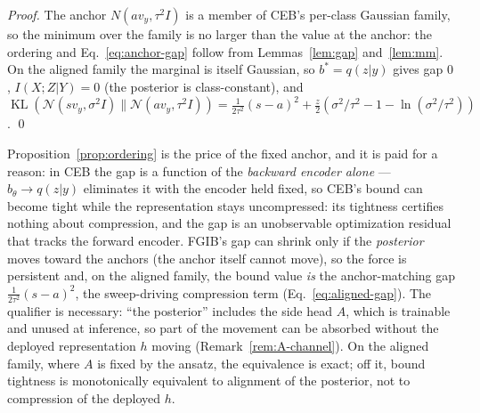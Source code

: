 \begin{proof}
The anchor $N(a v_y, \tau^2 I)$ is a member of CEB's per-class Gaussian family, so the
minimum over the family is no larger than the value at the anchor: the ordering and
Eq.~\eqref{eq:anchor-gap} follow from Lemmas~\ref{lem:gap} and~\ref{lem:mm}.
On the aligned family the marginal is itself Gaussian, so $b^* = q(z|y)$ gives gap $0$,
$I(X;Z|Y) = 0$ (the posterior is class-constant), and
$\operatorname{KL}(\mathcal{N}(s v_y, \sigma^2 I)\|\mathcal{N}(a v_y, \tau^2 I))
= \tfrac{1}{2\tau^2}(s-a)^2 + \tfrac{z}{2}(\sigma^2/\tau^2-1-\ln(\sigma^2/\tau^2))$.
\hfill\qed
\end{proof}

\begin{remark}\label{rem:force}
Proposition~\ref{prop:ordering} is the price of the fixed anchor, and it is paid for a
reason: in CEB the gap is a function of the \emph{backward encoder alone} ---
$b_\theta \to q(z|y)$ eliminates it with the encoder held fixed, so CEB's bound can
become tight while the representation stays uncompressed: its tightness certifies
nothing about compression, and the gap is an unobservable optimization residual that
tracks the forward encoder. FGIB's gap can shrink only if the \emph{posterior} moves
toward the anchors (the anchor itself cannot move), so the force is persistent and, on
the aligned family, the bound value \emph{is} the anchor-matching gap
$\tfrac{1}{2\tau^2}(s-a)^2$, the sweep-driving compression term
(Eq.~\eqref{eq:aligned-gap}). The qualifier is necessary: ``the posterior'' includes
the side head $A$, which is trainable and unused at inference, so part of the movement
can be absorbed without the deployed representation $h$ moving
(Remark~\ref{rem:A-channel}). On the aligned family, where $A$ is fixed by the ansatz,
the equivalence is exact; off it, bound tightness is monotonically equivalent to
alignment of the posterior, not to compression of the deployed $h$.
\end{remark}

